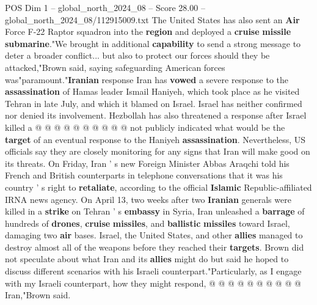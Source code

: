 \begin{textsample}{POS Dim 1 – global\_north\_2024\_08 – Score 28.00 – global\_north\_2024\_08/112915009.txt}
The United States has also sent an \textbf{Air} Force F-22 Raptor squadron into the \textbf{region} and deployed a \textbf{cruise} \textbf{missile} \textbf{submarine}."We brought in additional \textbf{capability} to send a strong message to deter a broader conflict... but also to protect our forces should they be attacked,"Brown said, saying safeguarding American forces was"paramount."\textbf{Iranian} response Iran has \textbf{vowed} a severe response to the \textbf{assassination} of Hamas leader Ismail Haniyeh, which took place as he visited Tehran in late July, and which it blamed on Israel.
Israel has neither confirmed nor denied its involvement.
Hezbollah has also threatened a response after Israel killed a @ @ @ @ @ @ @ @ @ @ not publicly indicated what would be the \textbf{target} of an eventual response to the Haniyeh \textbf{assassination}.
Nevertheless, US officials say they are closely monitoring for any signs that Iran will make good on its threats.
On Friday, Iran ' s new Foreign Minister Abbas Araqchi told his French and British counterparts in telephone conversations that it was his country ' s right to \textbf{retaliate}, according to the official \textbf{Islamic} Republic-affiliated IRNA news agency.
On April 13, two weeks after two \textbf{Iranian} generals were killed in a \textbf{strike} on Tehran ' s \textbf{embassy} in Syria, Iran unleashed a \textbf{barrage} of hundreds of \textbf{drones}, \textbf{cruise} \textbf{missiles}, and \textbf{ballistic} \textbf{missiles} toward Israel, damaging two \textbf{air} bases.
Israel, the United States, and other \textbf{allies} managed to destroy almost all of the weapons before they reached their \textbf{targets}.
Brown did not speculate about what Iran and its \textbf{allies} might do but said he hoped to discuss different scenarios with his Israeli counterpart."Particularly, as I engage with my Israeli counterpart, how they might respond, @ @ @ @ @ @ @ @ @ @ Iran,"Brown said.

\end{textsample}
